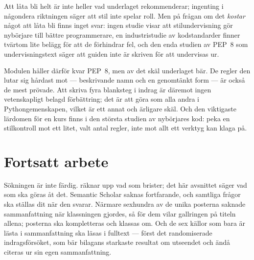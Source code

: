 Att låta bli helt är inte heller vad underlaget rekommenderar; ingenting
i någondera riktningen säger att stil inte spelar roll.  Men på frågan om
det \emph{kostar} något att låta bli finns inget svar: ingen studie visar
att stilundervisning gör nybörjare till bättre programmerare, en
industristudie av kodstandarder finner tvärtom lite belägg för att de
förhindrar fel, och den enda studien av PEP~8 som undervisningstext säger
att guiden inte är skriven för att undervisas ur.

Modulen håller därför kvar PEP~8, men av det skäl underlaget bär.  De
regler den lutar sig hårdast mot --- beskrivande namn och en genomtänkt
form --- är också de mest prövade.  Att skriva fyra blanksteg i indrag är
däremot ingen vetenskapligt belagd förbättring; det är att göra som alla
andra i Pythongemenskapen, vilket är ett annat och ärligare skäl.  Och
den viktigaste lärdomen för en kurs finns i den största studien av
nybörjares kod: peka en stilkontroll mot ett litet, valt antal regler,
inte mot allt ett verktyg kan klaga
på\autocite[avsnitt~6]{Keuning2017StudentCodeQuality}.

\section{Fortsatt arbete}
\label{sec:pep8-fortsatt}

Sökningen är inte färdig.   räknar upp vad som
brister; det här avsnittet säger vad som ska göras åt det.  Semantic
Scholar saknas fortfarande, och samtliga frågor ska ställas dit när den
svarar.  Närmare
sexhundra av de
unika posterna saknade sammanfattning när klassningen gjordes, så för
dem vilar gallringen på titeln allena; posterna ska kompletteras och
klassas om.  Och de sex källor som bara är lästa i sammanfattning ska
läsas i fulltext\autocite{Scanniello2017Abbreviated,
  Hanenberg2024Indentation,BoogerdMoonen2008CodingStandards,
  Kirk2024StyleNotQuality,Kirk2025DistillingPEP8,
  vanderWerf2024TeachersNaming} --- först det randomiserade
indragsförsöket, som bär bilagans starkaste resultat om utseendet och
ändå citeras ur sin egen sammanfattning.

